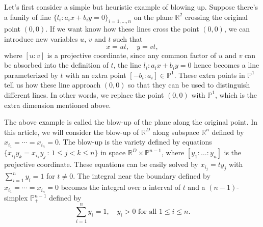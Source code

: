\documentclass[12pt]{article}
\theoremstyle{definition}
\theoremstyle{plain}
\begin{document}
Let's first consider a simple but heuristic example of blowing up. 
Suppose there's a family of line $\{l_i: a_ix+b_iy=0\}_{i=1,\dots,n}$ on the plane 
$\mathbb R^2$
crossing the original point $(0,0)$. 
If we want know how these lines cross the point $(0,0)$, we can introduce 
new variables $u$, $v$ and $t$ such that
\[
	x=ut,\quad y=vt,
\] 
where $[u:v]$ is a projective coordinate, since any common factor of $u$ and $v$ can be absorbed into the definition of $t$, the line $l_i:a_ix+b_iy=0$ hence becomes a line parameterized 
by $t$ with an extra point $[-b_i:a_i]\in \mathbb P^1$. These extra points in $\mathbb P^1$ tell us how these line approach $(0,0)$ so that they can be used to distinguish different lines.
In other words, we replace the point $(0,0)$ with $\mathbb P^1$, which is the extra dimension mentioned above. 


The above example is called the blow-up of the plane along the original point.
In this article, we will consider the blow-up of $\mathbb R^D$
along subspace $\mathbb R^n$ defined by $x_{i_1}=\cdots=x_{i_n}=0$. 
The blow-up is the variety defined by equations 
$\{x_{i_j}y_k=x_{i_k}y_j\,:\, 1\leq j<k\leq n\}$ in space 
$\mathbb R^{D}\times \mathbb P^{n-1}$,
where $[y_1:\dots:y_n]$ is the projective coordinate. 
These equations can be easily solved by $x_{i_j}=ty_{j}$ with
$\sum_{i=1}^n y_i=1$ for $t\neq 0$. 
The integral near the boundary defined by $x_{i_1}=\cdots=x_{i_n}=0$
becomes the integral over a interval of $t$ and a $(n-1)$-simplex $\mathbb P_+^{n-1}$ 
defined by
\[
	\sum_{i=1}^n y_i=1,\quad \text{$y_i>0$ for all $1\leq i\leq n$}.
\]
\end{document}
